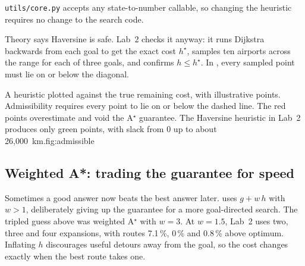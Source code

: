 \texttt{utils/core.py} accepts any state-to-number callable, so changing the heuristic requires no change to the search code.

Theory says Haversine is safe. Lab~2 checks it anyway: it runs Dijkstra backwards from each goal to get the exact cost $h^\star$, samples ten airports across the range for each of three goals, and confirms $h\le h^\star$. In , every sampled point must lie on or below the diagonal.

\begin{utpfig}{A heuristic plotted against the true remaining cost, with illustrative points. Admissibility requires every point to lie on or below the dashed line. The red points overestimate and void the A$^\star$ guarantee. The Haversine heuristic in Lab~2 produces only green points, with slack from 0 up to about 26,000~km.}{fig:admissible}
\end{utpfig}

\subsection{Weighted A*: trading the guarantee for speed}

Sometimes a good answer now beats the best answer later.  uses $g+w\,h$ with $w>1$, deliberately giving up the guarantee for a more goal-directed search. The tripled guess above was weighted A$^\star$ with $w=3$. At $w=1.5$, Lab~2 uses two, three and four expansions, with routes 7.1\,\%, 0\,\% and 0.8\,\% above optimum. Inflating $h$ discourages useful detours away from the goal, so the cost changes exactly when the best route takes one.

